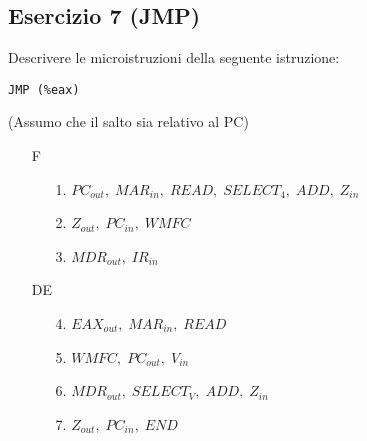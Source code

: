 \documentclass[a4paper]{article}
\theoremstyle{break}
\theoremstyle{break}
\theoremstyle{break}
\theoremstyle{break}
\begin{document}
\subsection{Esercizio 7 (JMP)}
\begin{exercise}
  Descrivere le microistruzioni della seguente istruzione:
  \begin{center}
    \texttt{JMP (\%eax)}
  \end{center}
  (Assumo che il salto sia relativo al PC)
  \begin{enumerate}
    \item [F]
      \begin{enumerate}
        \item [1.] \( PC_{out},\; MAR_{in},\; READ,\; SELECT_4,\; ADD,\; Z_{in} \) 
        \item [2.] \( Z_{out},\; PC_{in},\; WMFC \) 
        \item [3.] \( MDR_{out},\; IR_{in} \) 
      \end{enumerate}
    \item [DE]
      \begin{enumerate}
        \item [4.] \( EAX_{out},\; MAR_{in},\; READ \) 
        \item [5.] \( WMFC,\; PC_{out},\; V_{in} \) 
        \item [6.] \( MDR_{out},\; SELECT_V,\; ADD,\; Z_{in} \) 
        \item [7.] \( Z_{out},\; PC_{in},\; END \) 
      \end{enumerate}
  \end{enumerate}
\end{exercise}
\end{document}
